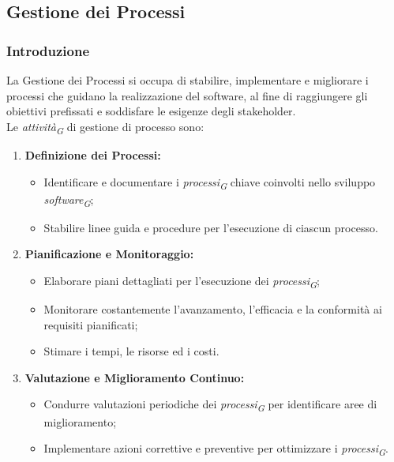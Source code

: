 \subsection{Gestione dei Processi}

\subsubsection{Introduzione}
La Gestione dei Processi si occupa di stabilire, implementare e migliorare i processi che guidano la realizzazione del software, al fine di raggiungere gli obiettivi prefissati e soddisfare le esigenze degli stakeholder.
\\
Le \textit{attività}\textsubscript{\textit{G}} di gestione di processo sono:
\begin{enumerate}
    \item \textbf{Definizione dei Processi:}
      \begin{itemize}
        \item Identificare e documentare i \textit{processi}\textsubscript{\textit{G}} chiave coinvolti nello sviluppo \textit{software}\textsubscript{\textit{G}};
        \item Stabilire linee guida e procedure per l'esecuzione di ciascun processo.
      \end{itemize}
  
    \item \textbf{Pianificazione e Monitoraggio:}
      \begin{itemize}
        \item Elaborare piani dettagliati per l'esecuzione dei \textit{processi}\textsubscript{\textit{G}};
        \item Monitorare costantemente l'avanzamento, l'efficacia e la conformità ai requisiti pianificati;
        \item Stimare i tempi, le risorse ed i costi.
      \end{itemize}
  
    \item \textbf{Valutazione e Miglioramento Continuo:}
      \begin{itemize}
        \item Condurre valutazioni periodiche dei \textit{processi}\textsubscript{\textit{G}} per identificare aree di miglioramento;
        \item Implementare azioni correttive e preventive per ottimizzare i \textit{processi}\textsubscript{\textit{G}}.
      \end{itemize}
  

\end{enumerate}
